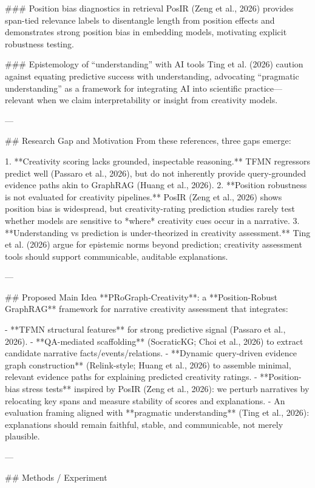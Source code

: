 ### Position bias diagnostics in retrieval  
PosIR (Zeng et al., 2026) provides span-tied relevance labels to disentangle length from position effects and demonstrates strong position bias in embedding models, motivating explicit robustness testing.

### Epistemology of “understanding” with AI tools  
Ting et al. (2026) caution against equating predictive success with understanding, advocating “pragmatic understanding” as a framework for integrating AI into scientific practice—relevant when we claim interpretability or insight from creativity models.

---

## Research Gap and Motivation  
From these references, three gaps emerge:

1. **Creativity scoring lacks grounded, inspectable reasoning.** TFMN regressors predict well (Passaro et al., 2026), but do not inherently provide query-grounded evidence paths akin to GraphRAG (Huang et al., 2026).  
2. **Position robustness is not evaluated for creativity pipelines.** PosIR (Zeng et al., 2026) shows position bias is widespread, but creativity-rating prediction studies rarely test whether models are sensitive to *where* creativity cues occur in a narrative.  
3. **Understanding vs prediction is under-theorized in creativity assessment.** Ting et al. (2026) argue for epistemic norms beyond prediction; creativity assessment tools should support communicable, auditable explanations.

---

## Proposed Main Idea  
**PRoGraph-Creativity**: a **Position-Robust GraphRAG** framework for narrative creativity assessment that integrates:

- **TFMN structural features** for strong predictive signal (Passaro et al., 2026).  
- **QA-mediated scaffolding** (SocraticKG; Choi et al., 2026) to extract candidate narrative facts/events/relations.  
- **Dynamic query-driven evidence graph construction** (Relink-style; Huang et al., 2026) to assemble minimal, relevant evidence paths for explaining predicted creativity ratings.  
- **Position-bias stress tests** inspired by PosIR (Zeng et al., 2026): we perturb narratives by relocating key spans and measure stability of scores and explanations.  
- An evaluation framing aligned with **pragmatic understanding** (Ting et al., 2026): explanations should remain faithful, stable, and communicable, not merely plausible.

---

## Methods / Experiment  

